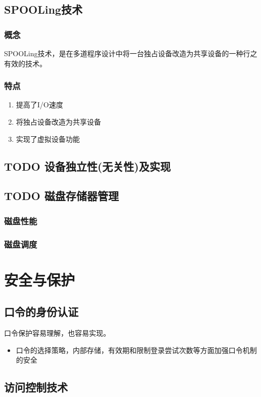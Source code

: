 \documentclass[11pt]{article}
\begin{document}
\subsection{SPOOLing技术}
\label{sec-5-6}
\subsubsection{概念}
\label{sec-5-6-1}
SPOOLing技术，是在多道程序设计中将一台独占设备改造为共享设备的一种行之有效的技术。
\subsubsection{特点}
\label{sec-5-6-2}
\begin{enumerate}
\item 提高了I/O速度
\item 将独占设备改造为共享设备
\item 实现了虚拟设备功能
\end{enumerate}
\subsection{{\bfseries\sffamily TODO} 设备独立性(无关性)及实现}
\label{sec-5-7}
\subsection{{\bfseries\sffamily TODO} 磁盘存储器管理}
\label{sec-5-8}
\subsubsection{磁盘性能}
\label{sec-5-8-1}
\subsubsection{磁盘调度}
\label{sec-5-8-2}

\section{安全与保护}
\label{sec-6}
\subsection{口令的身份认证}
\label{sec-6-1}
口令保护容易理解，也容易实现。
\begin{itemize}
\item 口令的选择策略，内部存储，有效期和限制登录尝试次数等方面加强口令机制的安全
\end{itemize}
\subsection{访问控制技术}
\label{sec-6-2}
\end{document}

